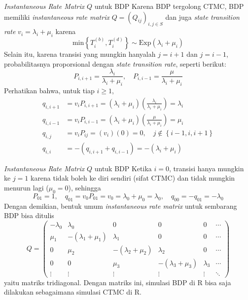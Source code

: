 \documentclass{beamer}
\newcommand{\pars}[1]{\left(#1\right)}
\newcommand{\braces}[1]{\left\{#1\right\}}
\begin{document}
\begin{frame}{\textit{Instantaneous Rate Matrix} \(Q\) untuk BDP}
    Karena BDP tergolong CTMC, BDP memiliki \textit{instantaneous rate matrix} \(Q = \pars{Q_{ij}}_{i,j\in S}\) dan juga \textit{state transition rate} \(v_i = \lambda_i + \mu_i\) karena
    \[\text{min}\braces{T_i^{(b)}, T_i^{(d)}} \sim \text{Exp}\pars{\lambda_i + \mu_i}\]
    Selain itu, karena transisi yang mungkin hanyalah \(j=i+1\) dan \(j=i-1\), probabilitasnya proporsional dengan \textit{state transition rate}, seperti berikut:
    \[P_{i,i+1} = \frac{\lambda_i}{\lambda_i + \mu_i}, \quad P_{i,i-1} = \frac{\mu}{\lambda_i + \mu_i}\]
    Perhatikan bahwa, untuk tiap \(i \ge 1\),
    \begin{align*}
        q_{i,i+1} &= v_i P_{i,i+1} = \pars{\lambda_i + \mu_i} \pars{\frac{\lambda_i}{\lambda_i + \mu_i}} = \lambda_i \\
        q_{i,i-1} &= v_i P_{i,i-1} = \pars{\lambda_i + \mu_i} \pars{\frac{\mu}{\lambda_i + \mu_i}} = \mu_i \\
        q_{i,j} &= v_i P_{ij} = \pars{v_i} (0) = 0, \quad j \notin \braces{i-1, i, i+1} \\
        q_{i,i} &= -\pars{q_{i,i+1} + q_{i,i-1}} = -\pars{\lambda_i + \mu_i}
    \end{align*}
\end{frame}

\begin{frame}{\textit{Instantaneous Rate Matrix} \(Q\) untuk BDP}
    Ketika \(i=0\), transisi hanya mungkin ke \(j=1\) karena tidak boleh ke diri sendiri (sifat CTMC) dan tidak mungkin menurun lagi (\(\mu_0 = 0\)), sehingga
    \[P_{01} = 1, \quad q_{01} = v_0 P_{01} = v_0 = \lambda_0 + \mu_0 = \lambda_0, \quad q_{00} = -q_{01} = -\lambda_0\]
    Dengan demikian, bentuk umum \textit{instantaneous rate matrix} untuk sembarang BDP bisa ditulis
    \[Q = \begin{pmatrix}
        -\lambda_0 & \lambda_0 & 0 & 0 & 0 & \cdots \\
        \mu_1 & -\pars{\lambda_1 + \mu_1} & \lambda_1 & 0 & 0 & \cdots \\
        0 & \mu_2 & -\pars{\lambda_2 + \mu_2} & \lambda_2 & 0 & \cdots \\
        0 & 0 & \mu_3 & -\pars{\lambda_3 + \mu_3} & \lambda_3 & \cdots \\
        \vdots & \vdots & \vdots & \vdots & \vdots & \ddots
    \end{pmatrix}\]
    yaitu matriks tridiagonal. Dengan matriks ini, simulasi BDP di R bisa saja dilakukan sebagaimana simulasi CTMC di R.
\end{frame}
\end{document}
